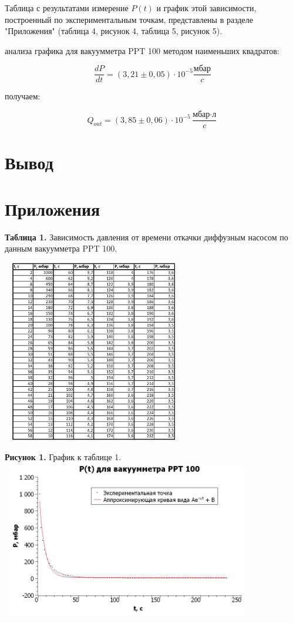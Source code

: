 \documentclass[15pt,a5paper,reqno]{article}
\begin{document}
    Таблица с результатами измерение $P(t)$ и график этой зависимости, построенный по экспериментальным точкам, представлены в разделе "Приложения" (таблица 4, рисунок 4, таблица 5, рисунок 5).
    
     анализа графика для вакуумметра PPT 100 методом наименьших квадратов:
    
    \[\frac{dP}{dt} = (3,21 \pm 0,05)\cdot10^{-5}\frac{\text{мбар}}{c}\]
    
     получаем:
    
    \[Q_{out} = (3,85 \pm 0,06)\cdot10^{-5}\frac{\text{мбар}\cdot\text{л}}{c}\]
    
    
\section{Вывод}

    

\newpage
\section{Приложения}
    
    \noindent\textbf{Таблица 1.} Зависимость давления от времени откачки диффузным насосом по данным вакуумметра PPT 100.

    \centering\includegraphics[width = 8cm, height = 8cm]{Диффузный насос, PPT 100_pages-to-jpg-0001.jpg}
  
    \newpage 
    \noindent\textbf{Рисунок 1.} График к таблице 1.
    \includegraphics[width = 11cm, height = 7cm]{Диффузный насос, PPT 100.jpg}
    
\end{document}
